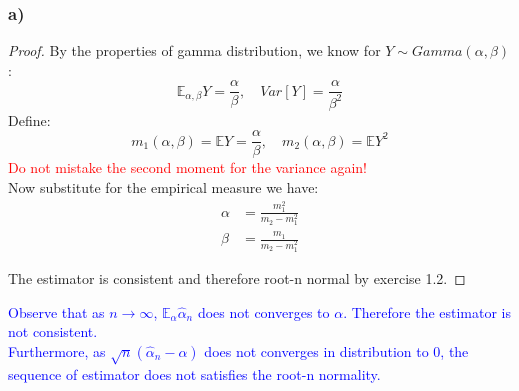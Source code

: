 \documentclass[a4paper,11pt]{article}
\theoremstyle{definition}
\theoremstyle{remark}
\begin{document}
\subsubsection*{a)}
\begin{proof}
By the properties of gamma distribution, we know for $Y \sim Gamma(\alpha, \beta)$:
\begin{equation*}
	\mathbb{E}_{\alpha, \beta} Y = \frac{\alpha}{\beta}, \quad Var[Y] = \frac{\alpha}{\beta^2} 
\end{equation*}
Define:
\begin{equation*}
	m_1(\alpha, \beta) = \mathbb{E} Y = \frac{\alpha}{\beta}, \quad
	m_2(\alpha, \beta) = \mathbb{E} Y^2
\end{equation*}
\textcolor{red}{Do not mistake the second moment for the variance again!}\\

Now substitute for the empirical measure we have:
\begin{equation*}
\begin{aligned}
	\alpha &= \frac{m_1^2}{m_2 - m_1^2} \\
	\beta &= \frac{m_1}{m_2 - m_1^2}
\end{aligned}
\end{equation*}

The estimator is consistent and therefore root-n normal by exercise 1.2. 

\end{proof}

\textcolor{blue}{
Observe that as $n \longrightarrow \infty$, $\mathbb{E}_{\alpha}\hat{\alpha}_n$ does not converges to $\alpha$. Therefore the estimator is not consistent. \\
Furthermore, as $ \sqrt{n}(\hat{\alpha}_n - \alpha)$ does not converges in distribution to 0, the sequence of estimator does not satisfies the root-n normality.}
\end{document}
